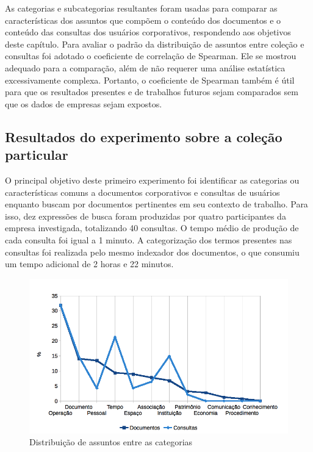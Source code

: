 As categorias e subcategorias resultantes foram usadas para comparar as características dos assuntos que compõem o conteúdo dos documentos e o conteúdo das consultas dos usuários corporativos, respondendo aos objetivos deste capítulo. Para avaliar o padrão da distribuição de assuntos entre coleção e consultas foi adotado o coeficiente de correlação de Spearman. Ele se mostrou adequado para a comparação, além de não requerer uma análise estatística excessivamente complexa. Portanto, o coeficiente de Spearman também é útil para que os resultados presentes e de trabalhos futuros sejam comparados sem que os dados de empresas sejam expostos.

\subsection{Resultados do experimento sobre a coleção particular}
\label{prototipo-resultados-particular}

O principal objetivo deste primeiro experimento foi identificar as categorias ou características comuns a documentos corporativos e consultas de usuários enquanto buscam por documentos pertinentes em seu contexto de trabalho. Para isso, dez expressões de busca foram produzidas por quatro participantes da empresa investigada, totalizando 40 consultas. O tempo médio de produção de cada consulta foi igual a 1 minuto. A categorização dos termos presentes nas consultas foi realizada pelo mesmo indexador dos documentos, o que consumiu um tempo adicional de 2 horas e 22 minutos.

\begin{figure}
	\caption{\label{fig:avaliacaoPart-distribuicaoAssuntos}Distribuição de assuntos entre as categorias}

	\centering
		\includegraphics[width=1.0\textwidth]{fig/avaliacaoPart-distribuicaoAssuntos.png}

\end{figure}

